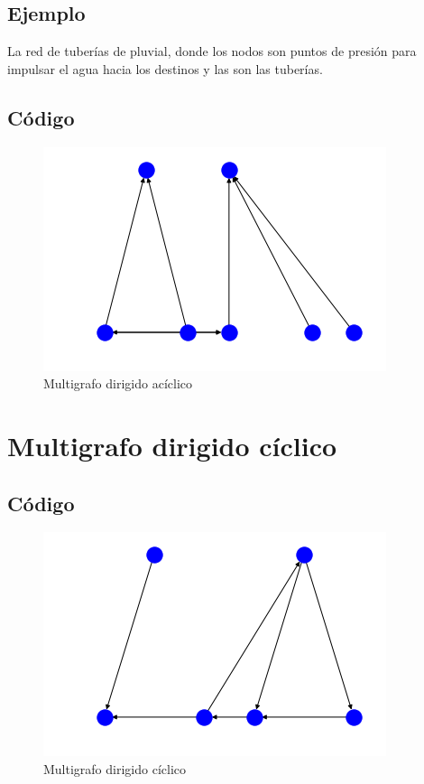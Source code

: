 \documentclass[10pt,a4paper]{article}
\begin{document}
\subsection{Ejemplo} La red de tuberías de pluvial, donde los nodos son puntos de presión para impulsar el agua hacia los destinos y las son las tuberías. 
\subsection{Código}
\begin{figure}[H]
\centering
\includegraphics[scale=.5]{multigrafodirigidoaciclico}
\caption{Multigrafo dirigido acíclico}
\end{figure}

\section{Multigrafo dirigido cíclico}
\subsection{Código}
\begin{figure}[H]
\centering
\includegraphics[scale=.5]{multigrafodirigidociclico}
\caption{Multigrafo dirigido cíclico}
\end{figure}
\end{document}
